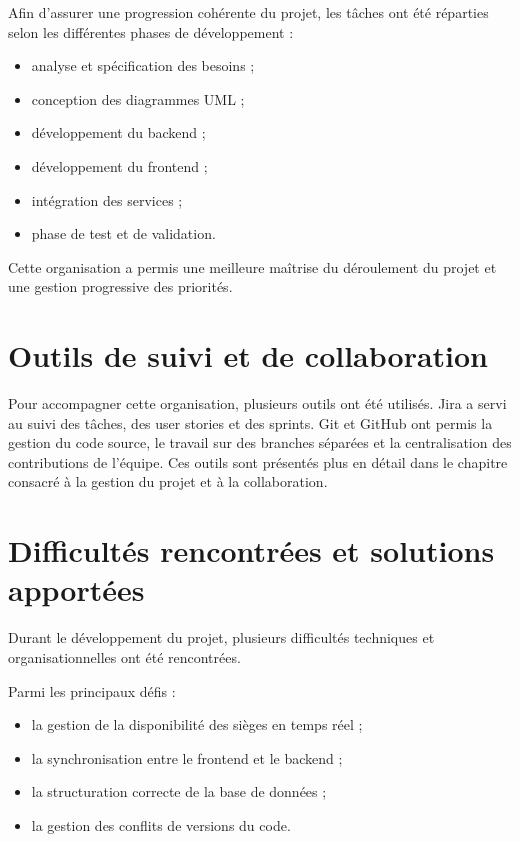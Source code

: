 \documentclass[12pt]{report}
\begin{document}
Afin d’assurer une progression cohérente du projet, les tâches ont été réparties selon les différentes phases de développement :

\begin{itemize}
    \item analyse et spécification des besoins ;
    \item conception des diagrammes UML ;
    \item développement du backend ;
    \item développement du frontend ;
    \item intégration des services ;
    \item phase de test et de validation.
\end{itemize}

Cette organisation a permis une meilleure maîtrise du déroulement du projet et une gestion progressive des priorités.

\section{Outils de suivi et de collaboration}

Pour accompagner cette organisation, plusieurs outils ont été utilisés. Jira a
servi au suivi des tâches, des user stories et des sprints. Git et GitHub ont
permis la gestion du code source, le travail sur des branches séparées et la
centralisation des contributions de l’équipe. Ces outils sont présentés plus en
détail dans le chapitre consacré à la gestion du projet et à la collaboration.


\section{Difficultés rencontrées et solutions apportées}

Durant le développement du projet, plusieurs difficultés techniques et organisationnelles ont été rencontrées.

Parmi les principaux défis :

\begin{itemize}
    \item la gestion de la disponibilité des sièges en temps réel ;
    \item la synchronisation entre le frontend et le backend ;
    \item la structuration correcte de la base de données ;
    \item la gestion des conflits de versions du code.
\end{itemize}
\end{document}
